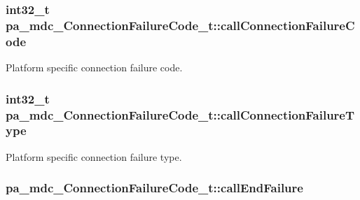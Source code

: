 \subsubsection[{\texorpdfstring{call\+Connection\+Failure\+Code}{callConnectionFailureCode}}]{\setlength{\rightskip}{0pt plus 5cm}int32\+\_\+t pa\+\_\+mdc\+\_\+\+Connection\+Failure\+Code\+\_\+t\+::call\+Connection\+Failure\+Code}\hypertarget{structpa__mdc___connection_failure_code__t_a26feea2c0f3e60648a6f79c2b5f6c83d}{}\label{structpa__mdc___connection_failure_code__t_a26feea2c0f3e60648a6f79c2b5f6c83d}


Platform specific connection failure code. 

\subsubsection[{\texorpdfstring{call\+Connection\+Failure\+Type}{callConnectionFailureType}}]{\setlength{\rightskip}{0pt plus 5cm}int32\+\_\+t pa\+\_\+mdc\+\_\+\+Connection\+Failure\+Code\+\_\+t\+::call\+Connection\+Failure\+Type}\hypertarget{structpa__mdc___connection_failure_code__t_a9212bcc5698b48e5c10b1964103ee651}{}\label{structpa__mdc___connection_failure_code__t_a9212bcc5698b48e5c10b1964103ee651}


Platform specific connection failure type. 

\subsubsection[{\texorpdfstring{call\+End\+Failure}{callEndFailure}}]{ pa\+\_\+mdc\+\_\+\+Connection\+Failure\+Code\+\_\+t\+::call\+End\+Failure}\hypertarget{structpa__mdc___connection_failure_code__t_aa164be5787276d26a94f031c43b2ccf6}{}\label{structpa__mdc___connection_failure_code__t_aa164be5787276d26a94f031c43b2ccf6}


